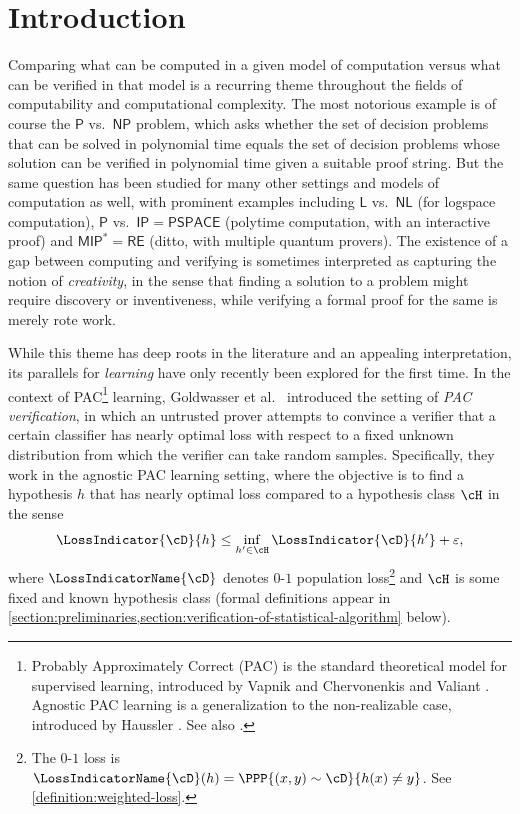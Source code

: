 
%
%
%

\section{Introduction}

Comparing what can be computed in a given model of computation versus what can be verified in that model is a recurring theme throughout the fields of computability and computational complexity. The most notorious example is of course the $\mathsf{P}$ vs.\ $\mathsf{NP}$ problem, which asks whether the set of decision problems that can be solved in polynomial time equals the set of decision problems whose solution can be verified in polynomial time given a suitable proof string. But the same question has been studied for many other settings and models of computation as well, with prominent examples including $\mathsf{L}$ vs.\ $\mathsf{NL}$ (for logspace computation), $\mathsf{P}$ vs.\ $\mathsf{IP} = \mathsf{PSPACE}$ (polytime computation, with an interactive proof) and $\mathsf{MIP}^* = \mathsf{RE}$ (ditto, with multiple quantum provers). The existence of a gap between computing and verifying is sometimes interpreted as capturing the notion of \emph{creativity}, in the sense that finding a solution to a problem might require discovery or inventiveness, while verifying a formal proof for the same is merely rote work.

While this theme has deep roots in the literature and an appealing interpretation, its parallels for \emph{learning} have only recently been explored for the first time. In the context of PAC\footnote{Probably Approximately Correct (PAC) is the standard theoretical model for supervised learning, introduced by Vapnik and Chervonenkis \cite{VapChe68} and Valiant \cite{Valiant84}. Agnostic PAC learning is a generalization to the non-realizable case, introduced by Haussler \cite{Haussler92}. See also \cite{0033642}.} learning, Goldwasser et al.\ \cite{GoldwasserRSY21} introduced the setting of \emph{PAC verification}, in which an untrusted prover attempts to convince a verifier that a certain classifier has %
%
nearly optimal %
loss with respect to a fixed unknown distribution from which the verifier can take random samples. Specifically, they work in the agnostic PAC learning setting, where the objective is to find a hypothesis $h$ that has nearly optimal loss compared to a hypothesis class $\cH$ in the sense 
\begin{equation}\label{eq:pac-learning}
	\LossIndicator{\cD}{h} \leq \inf_{h' \in \cH} \LossIndicator{\cD}{h'} + \varepsilon,
\end{equation}
where $\LossIndicatorName{\cD}$ denotes $0$-$1$ population loss\footnote{%
	The $0$-$1$ loss is $\LossIndicatorName{\cD}(h) = \PPP{(x,y) \sim \cD}{h(x) \neq y}$. See \cref{definition:weighted-loss}.%
} and $\cH$ is some fixed and known hypothesis class (formal definitions appear in \cref{section:preliminaries,section:verification-of-statistical-algorithm} below). 

